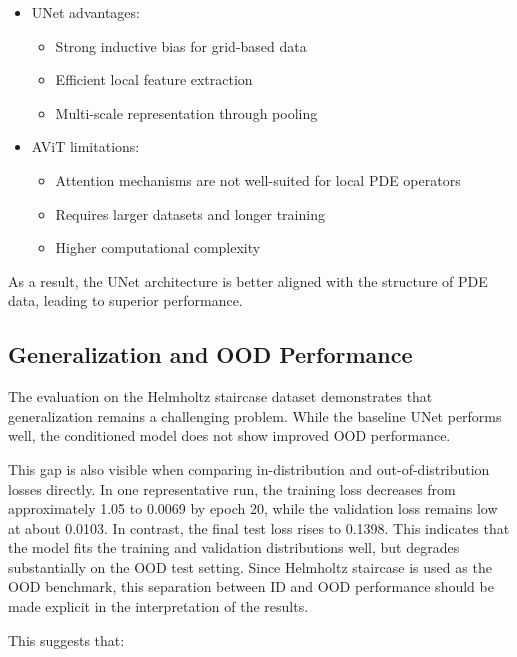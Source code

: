 \documentclass[
]{article}
\providecommand{\tightlist}{%
  \setlength{\itemsep}{0pt}\setlength{\parskip}{0pt}}
\begin{document}
\begin{itemize}
\tightlist
\item
  UNet advantages:

  \begin{itemize}
  \tightlist
  \item
    Strong inductive bias for grid-based data
  \item
    Efficient local feature extraction
  \item
    Multi-scale representation through pooling
  \end{itemize}
\item
  AViT limitations:

  \begin{itemize}
  \tightlist
  \item
    Attention mechanisms are not well-suited for local PDE operators
  \item
    Requires larger datasets and longer training
  \item
    Higher computational complexity
  \end{itemize}
\end{itemize}

As a result, the UNet architecture is better aligned with the structure
of PDE data, leading to superior performance.

\subsection{Generalization and OOD
Performance}\label{generalization-and-ood-performance}

The evaluation on the Helmholtz staircase dataset demonstrates that
generalization remains a challenging problem. While the baseline UNet
performs well, the conditioned model does not show improved OOD
performance.

This gap is also visible when comparing in-distribution and
out-of-distribution losses directly. In one representative run, the
training loss decreases from approximately 1.05 to 0.0069 by epoch 20,
while the validation loss remains low at about 0.0103. In contrast, the
final test loss rises to 0.1398. This indicates that the model fits the
training and validation distributions well, but degrades substantially
on the OOD test setting. Since Helmholtz staircase is used as the OOD
benchmark, this separation between ID and OOD performance should be made
explicit in the interpretation of the results.

This suggests that:
\end{document}
